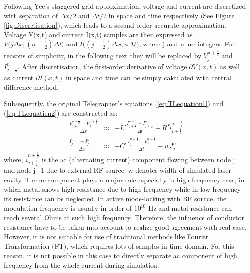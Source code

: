 \documentclass[11pt,final]{scrbook}
\begin{document}
Following Yee’s staggered grid approximation\cite{yee1966numerical}, voltage and current are discretized with separation of $\Delta x/2$ and $\Delta t/2$ in space and time respectively (See Figure \ref{fig:Discretisation}), which leads to a second-order accurate approximation. Voltage V(x,t) and current I(x,t) samples are then expressed as $ V\big(j\Delta x, (n+\frac{1}{2})\Delta t\big)$ and $ I\big((j+\frac{1}{2})\Delta x, n\Delta t\big)$, where j and n are integers. For reasons of simplicity, in the following text they will be replaced by $ V _{ j }^{ n+\frac{1}{2}}$ and ${ I }_{ j+\frac{1}{2} }^{ n }$. After discretization, the first-order derivative of voltage $\partial V(x,t)$ as well as current $\partial I(x,t)$ in space and time can be simply calculated with central difference method\cite{yang2012central}. 

Subsequently, the original Telegrapher's equations (\ref{eq:TLequation1}) and (\ref{eq:TLequation2}) are constructed as:
\begin{eqnarray}
\frac { { V }_{ j+1 }^{ n+\frac{1}{2} }-{ V }_{ j }^{ n+\frac{1}{2} } }{ \Delta x } & \approx & -L'\frac { { I }_{ j+\frac{1}{2} }^{ n+1 }-{ I }_{ j+\frac{1}{2} }^{ n } }{ \Delta t } -R' \widetilde{ i } _{ j+\frac{1}{2} }^{ n+\frac{1}{2} } \label{eq:TLequation3}\\
\frac{{ I }_{ j+\frac{1}{2} }^{ n } - { I }_{ j-\frac{1}{2} }^{ n }}{\Delta x} & \approx & -C'\frac {{ V }_{ j }^{ n+\frac{1}{2} }-{ V }_{ j }^{ n-\frac{1}{2} }}{ \Delta t }-w{J}_{j}^{n} \label{eq:TLequation4}
\end{eqnarray}
where, $ \widetilde{ i } _{ j+\frac{1}{2} }^{ n+\frac{1}{2} }$ is the ac (alternating current) component flowing between node j and node j+1 due to external RF source. w denotes width of simulated laser cavity. The ac component plays a major role especially in high frequency case, in which metal shows high resistance due to high frequency while in low frequency its resistance can be neglected. In active mode-locking with RF source, the modulation frequency is usually in order of $10^{10}$ Hz and metal resistance can reach several Ohms at such high frequency. Therefore, the influence of conductor resistance have to be taken into account to realize good agreement with real case. However, it is not suitable for use of traditional methods like Fourier Transformation (FT), which requires lots of samples in time domain. For this reason, it is not possible in this case to directly separate ac component of high frequency from the whole current during simulation.
\end{document}
